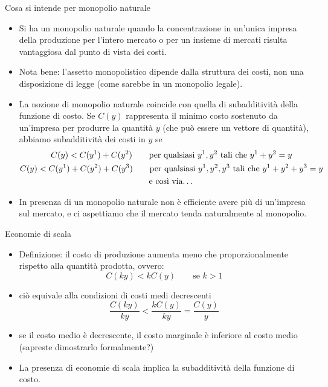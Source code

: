 \documentclass[aspectratio=64,12pt]{beamer}
\begin{document}
\begin{frame}{Cosa si intende per monopolio naturale}
\begin{itemize}
\item Si ha un monopolio \alert{naturale} quando la concentrazione in un'unica impresa
della produzione per l'intero mercato o per un insieme di mercati risulta
vantaggiosa dal punto di vista dei costi.
\item Nota bene: l'assetto monopolistico dipende dalla struttura dei costi,
  non una disposizione di legge (come sarebbe in un monopolio \alert{legale}).
\item La nozione di monopolio naturale coincide con quella di
\alert{subadditività della funzione di costo}. Se $C(y)$ rappresenta il \alert{minimo}
costo sostenuto da un'impresa per produrre la quantità $y$ (che può essere
un vettore di quantità), abbiamo subadditività dei costi in $y$ se
\begin{gather*}
 C(y) < C(y^1)+C(y^2) \qquad\text{per qualsiasi $y^1,y^2$ tali che $y^1+y^2=y$}\\
 C(y) < C(y^1)+C(y^2)+C(y^3) \qquad\text{per qualsiasi $y^1,y^2,y^3$ tali che $y^1+y^2+y^3=y$}\\
 \text{e così via\dots}
\end{gather*}
\item In presenza di un monopolio naturale \alert{non è efficiente} avere più di un'impresa
sul mercato, e ci aspettiamo che il mercato tenda naturalmente al \alert{monopolio}.
\end{itemize}
\end{frame}

\begin{frame}{Economie di scala}
\begin{itemize}
\item \alert{Definizione}: il costo di produzione aumenta meno che
proporzionalmente rispetto alla quantità prodotta, ovvero:
\begin{equation*}
 C(ky) < kC(y) \qquad\text{se }k>1
\end{equation*}
\item ciò equivale alla condizioni di \alert{costi medi decrescenti}
\begin{equation*}
\frac{C(ky)}{ky} < \frac{kC(y)}{ky} = \frac{C(y)}{y} 
\end{equation*}
\item se il costo medio è decrescente, \alert{il costo marginale è inferiore al costo
medio} (sapreste dimostrarlo formalmente?)
\item La presenza di economie di scala
implica la subadditività della funzione di costo.
\end{itemize}
\end{frame}
\end{document}
